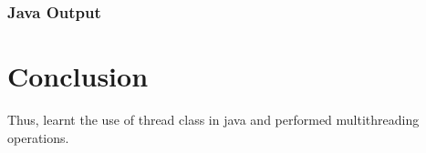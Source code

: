 \documentclass[11pt]{article}
\begin{document}


\subsubsection{Java Output}



\section{Conclusion}
Thus, learnt the use of thread class in java and performed multithreading operations.

\pagebreak


	
	
	
	
\end{document}
